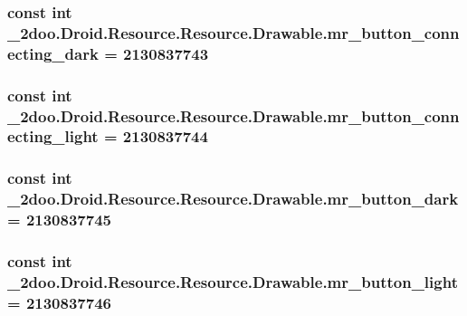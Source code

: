\hypertarget{class__2doo_1_1_droid_1_1_resource_1_1_drawable_d9fed8e0b68cdc4c73f305cee1fc9eb5}{
\subsubsection[{mr\_\-button\_\-connecting\_\-dark}]{\setlength{\rightskip}{0pt plus 5cm}const int \_\-2doo.Droid.Resource.Resource.Drawable.mr\_\-button\_\-connecting\_\-dark = 2130837743}}
\label{class__2doo_1_1_droid_1_1_resource_1_1_drawable_d9fed8e0b68cdc4c73f305cee1fc9eb5}


\hypertarget{class__2doo_1_1_droid_1_1_resource_1_1_drawable_bb3d8d82467b2985650e85f448160a2b}{
\subsubsection[{mr\_\-button\_\-connecting\_\-light}]{\setlength{\rightskip}{0pt plus 5cm}const int \_\-2doo.Droid.Resource.Resource.Drawable.mr\_\-button\_\-connecting\_\-light = 2130837744}}
\label{class__2doo_1_1_droid_1_1_resource_1_1_drawable_bb3d8d82467b2985650e85f448160a2b}


\hypertarget{class__2doo_1_1_droid_1_1_resource_1_1_drawable_1889870275a9ac7c053b0e2495b8ba09}{
\subsubsection[{mr\_\-button\_\-dark}]{\setlength{\rightskip}{0pt plus 5cm}const int \_\-2doo.Droid.Resource.Resource.Drawable.mr\_\-button\_\-dark = 2130837745}}
\label{class__2doo_1_1_droid_1_1_resource_1_1_drawable_1889870275a9ac7c053b0e2495b8ba09}


\hypertarget{class__2doo_1_1_droid_1_1_resource_1_1_drawable_aece5a60f60edc232ca56582f2f6a640}{
\subsubsection[{mr\_\-button\_\-light}]{\setlength{\rightskip}{0pt plus 5cm}const int \_\-2doo.Droid.Resource.Resource.Drawable.mr\_\-button\_\-light = 2130837746}}
\label{class__2doo_1_1_droid_1_1_resource_1_1_drawable_aece5a60f60edc232ca56582f2f6a640}



